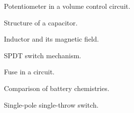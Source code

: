 \begin{figure}[h!]
    \centering
    \caption{Potentiometer in a volume control circuit.}
    \label{fig:potentiometer-volume-control}
\end{figure}

\begin{figure}[h!]
    \centering
    \caption{Structure of a capacitor.}
    \label{fig:capacitor-structure}
\end{figure}

\begin{figure}[h!]
    \centering
    \caption{Inductor and its magnetic field.}
    \label{fig:inductor-magnetic-field}
\end{figure}

\begin{figure}[h!]
    \centering
    \caption{SPDT switch mechanism.}
    \label{fig:spdt-switch}
\end{figure}

\begin{figure}[h!]
    \centering
    \caption{Fuse in a circuit.}
    \label{fig:fuse-circuit}
\end{figure}

\begin{figure}[h!]
    \centering
    \caption{Comparison of battery chemistries.}
    \label{fig:battery-chemistries}
\end{figure}

\begin{figure}[h!]
    \centering
    \caption{Single-pole single-throw switch.}
    \label{fig:spst-switch}
\end{figure}

